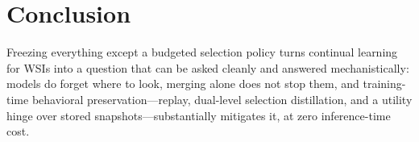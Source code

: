\documentclass{article}
\begin{document}
\section{Conclusion}
\label{sec:conclusion}
Freezing everything except a budgeted selection policy turns continual learning for WSIs into a question that can be asked cleanly and answered mechanistically: models do forget where to look, merging alone does not stop them, and training-time behavioral preservation---replay, dual-level selection distillation, and a utility hinge over stored snapshots---substantially mitigates it, at zero inference-time cost.




\end{document}
